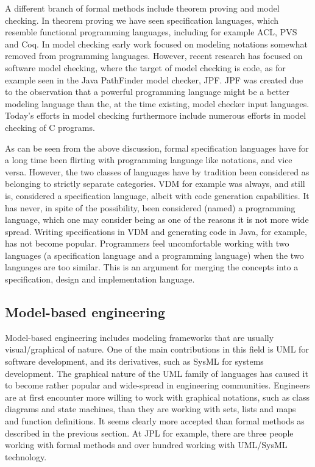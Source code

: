 A different branch of formal methods include theorem proving and 
model checking. In theorem proving we have seen specification 
languages, which resemble functional programming languages, 
including for example ACL, PVS and Coq. In model checking early 
work focused on modeling notations somewhat removed from 
programming languages. However, recent research has focused on 
software model checking, where the target of model checking is 
code, as for example seen in the Java PathFinder model checker, 
JPF. JPF was created due to the observation that a powerful 
programming language might be a better modeling language than the, 
at the time existing, model checker input languages. Today’s 
efforts in model checking furthermore include numerous efforts in 
model checking of C programs.

As can be seen from the above discussion, formal specification 
languages have for a long time been flirting with programming 
language like notations, and vice versa. However, the two classes of languages have by tradition been considered as belonging to 
strictly separate categories. VDM for example was always, and still 
is, considered a specification language, albeit with code 
generation capabilities. It has never, in spite of the possibility, 
been considered (named) a programming language, which one may 
consider being as one of the reasons it is not more wide spread. 
Writing specifications in VDM and generating code in Java, for 
example, has not become popular. Programmers feel uncomfortable 
working with two languages (a specification language and  a 
programming language) when the two languages are too similar. This 
is an argument for merging the concepts into a  specification, 
design and implementation language.


\subsection{Model-based engineering}

Model-based engineering includes modeling frameworks that are 
usually visual/graphical of nature. One of the main contributions 
in this field is UML for software development, and its derivatives, 
such as SysML for systems development. The graphical nature of the 
UML family of languages has caused it to become rather popular and 
wide-spread in engineering communities. Engineers are at first 
encounter more willing to work with graphical notations, such as 
class diagrams and state machines, than they are working with sets, 
lists and maps and function definitions. It seems clearly more 
accepted than formal methods as described in the previous section. 
At JPL for example, there are three people working with formal 
methods and over hundred working with UML/SysML technology. 

